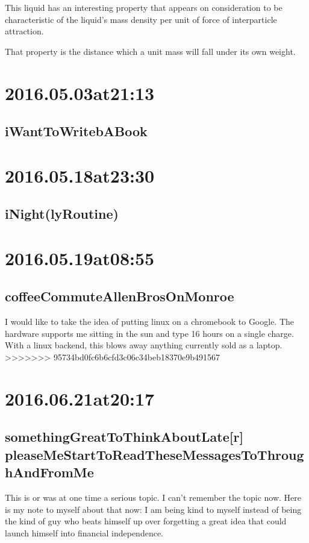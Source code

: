 \begin{enumerate}
\begin{enumerate}
This liquid has an interesting property that appears on consideration to be characteristic of the liquid's mass density per unit of force of interparticle attraction.

That property is the distance which a unit mass will fall under its own weight.

\section*{2016.05.03at21:13}
\subsection*{iWantToWritebABook}

\section*{ 2016.05.18at23:30 }
\subsection*{iNight(lyRoutine)}

\section*{ 2016.05.19at08:55 }
\subsection*{coffeeCommuteAllenBrosOnMonroe}
I would like to take the idea of putting linux on a chromebook to Google. The hardware supports me sitting in the sun and type 16 hours on a single charge. With a linux backend, this blows away anything currently sold as a laptop.
>>>>>>> 95734bd0fc6b6cfd3c06c34beb18370e9b491567

\section*{ 2016.06.21at20:17 }
\subsection*{ somethingGreatToThinkAboutLate[r] pleaseMeStartToReadTheseMessagesToThroughAndFromMe }
This is or was at one time a serious topic. I can't remember the topic now. Here is my note to myself about that now: I am being kind to myself instead of being the kind of guy who beats himself up over forgetting a great idea that could launch himself into financial independence.




\end{enumerate}
\end{enumerate}
